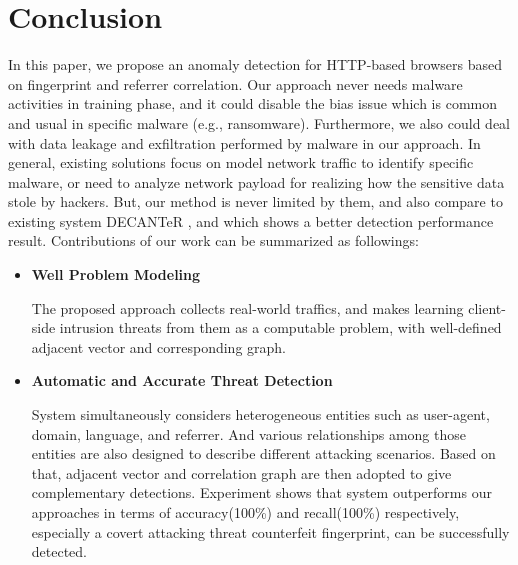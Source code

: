 \section{Conclusion}

In this paper, we propose an anomaly detection for HTTP-based browsers based on fingerprint and referrer correlation. Our approach never needs malware activities in training phase, and it could disable the bias issue which is common and usual in specific malware (e.g., ransomware). Furthermore, we also could deal with data leakage and exfiltration performed by malware in our approach. In general, existing solutions focus on model network traffic to identify specific malware, or need to analyze network payload for realizing how the sensitive data stole by hackers. But, our method is never limited by them, and also compare to existing system DECANTeR \cite{bortolameotti2017decanter}, and which shows a better detection performance result. Contributions of our work can be summarized as followings:

\begin{itemize}

\item {\bf Well Problem Modeling}

The proposed approach collects real-world traffics, and makes learning client-side intrusion threats from them as a computable problem, with well-defined adjacent vector and corresponding graph.  

\item {\bf Automatic and Accurate Threat Detection}

System simultaneously considers heterogeneous entities such as user-agent, domain, language, and referrer. And various relationships among those entities are also designed to describe different attacking scenarios. Based on that, adjacent vector and correlation graph are then adopted to give complementary detections. Experiment shows that system outperforms our approaches in terms of accuracy(100\%) and recall(100\%) respectively, especially a covert attacking threat counterfeit fingerprint, can be successfully detected.

\end{itemize}